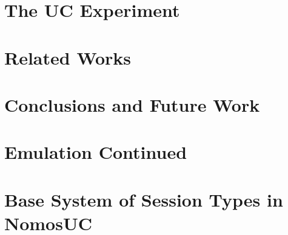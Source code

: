 \documentclass[acmsmall,screen,review,anonymous]{acmart}
\begin{document}
\section{The UC Experiment} \label{sec:execuc}


%

%
%


\section{Related Works} \label{sec:related}


\section{Conclusions and Future Work}






\appendix

% 

\section{Emulation Continued} \label{app:emulation}


\section{Base System of Session Types in NomosUC} \label{app:basic}

\end{document}
